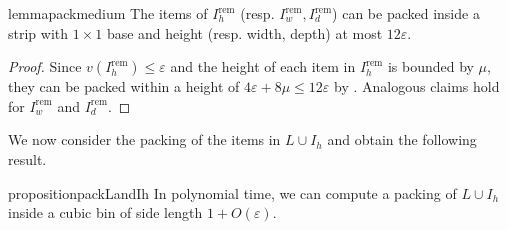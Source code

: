 \documentclass[a4paper,UKenglish,cleveref, autoref, thm-restate]{lipics-v2021}
\newcommand{\eps}{\varepsilon}
\begin{document}
\begin{restatable}{lemma}{packmedium}
\label{lem:packmedium}
    The items of $I^{\text{rem}}_h$ (resp. $I^{\text{rem}}_w,I^{\text{rem}}_d$) can be packed inside a strip with $1\times 1$ base and height (resp. width, depth) at most $12\varepsilon$.
\end{restatable}
\begin{proof}
    Since $v(I^{\text{rem}}_h) \le \varepsilon$ and the height of each item in $I^{\text{rem}}_h$ is bounded by $\mu$, they can be packed within a height of $4\eps + 8\mu \le 12\varepsilon$ by . Analogous claims hold for $I^{\text{rem}}_w$ and $I^{\text{rem}}_d$.
\end{proof}

We now consider the packing of the items in $L\cup I_h$ and obtain the following result.
\begin{restatable}{proposition}{packLandIh}
\label{pro:packLandIh}
    In polynomial time, we can compute a packing of $L\cup I_h$ inside a cubic bin of side length $1+O(\varepsilon)$.
\end{restatable}
\end{document}
